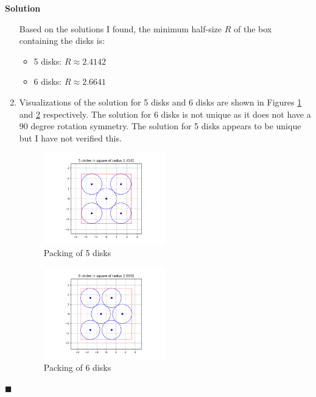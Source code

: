 \documentclass[11pt]{article}
\theoremstyle{problemstyle}
\newenvironment{solution}
  {\noindent\textbf{Solution}\quad}
  {\hfill$\blacksquare$\par\vspace{1em}}
\begin{document}
\begin{solution}
\begin{enumerate}
      Based on the solutions I found, the minimum half-size $R$ of the box containing the disks is:
      \begin{itemize}
        \item 5 disks: $R \approx 2.4142$
        \item 6 disks: $R \approx 2.6641$
      \end{itemize}
    \item Visualizations of the solution for 5 disks and 6 disks are shown in
      Figures \ref{fig:5disks} and \ref{fig:6disks} respectively. The solution for 6 disks is not unique as it does not
      have a 90 degree rotation symmetry. The solution for 5 disks appears to be unique but I have not verified this.
      \begin{figure}[h]
        \centering
        \includegraphics[width=0.5\textwidth]{5_circles.png}
        \caption{Packing of 5 disks}
        \label{fig:5disks}
      \end{figure}

      \begin{figure}[h]
        \centering
        \includegraphics[width=0.5\textwidth]{6_circles.png}
        \caption{Packing of 6 disks}
        \label{fig:6disks}
      \end{figure}
  \end{enumerate}
\end{solution}
\end{document}

